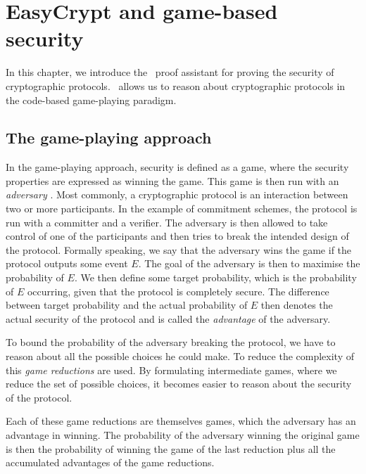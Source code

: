\chapter{EasyCrypt and game-based security}
\label{ch:EasyCrypt}
In this chapter, we introduce the \easycrypt\ proof assistant for proving the security
of cryptographic protocols. \easycrypt\ allows us to reason about cryptographic
protocols in the code-based game-playing paradigm.

\section{The game-playing approach}
\label{sec:game-based-sec}
In the game-playing approach, security is defined as a game, where
the security properties are expressed as winning the game. This game is then run with an
\textit{adversary} \cite{game-playing}. Most commonly, a cryptographic protocol
is an interaction between two or more participants. In the example of commitment schemes,
the protocol is run with a committer and a verifier. The adversary is then
allowed to take control of one of the participants and then tries to break the
intended design of the protocol.
Formally speaking, we say that the adversary
wins the game if the protocol outputs some event $E$. The goal of the adversary
is then to maximise the probability of $E$.
We then define some target probability, which is the probability of $E$
occurring, given that the protocol is completely secure. The difference between
target probability and the actual probability of $E$ then denotes the actual
security of the protocol and is called the \textit{advantage} of the adversary.

To bound the probability of the adversary breaking the protocol, we have to
reason about all the possible choices he could make. To reduce the complexity of
this \textit{game reductions} are used. By formulating intermediate games, where
we reduce the set of possible choices, it becomes easier to reason
about the security of the protocol.

Each of these game reductions are themselves games, which the adversary has an advantage in winning.
The probability of the adversary winning the original game is then the probability of winning
the game of the last reduction plus all the accumulated advantages of the
game reductions.

